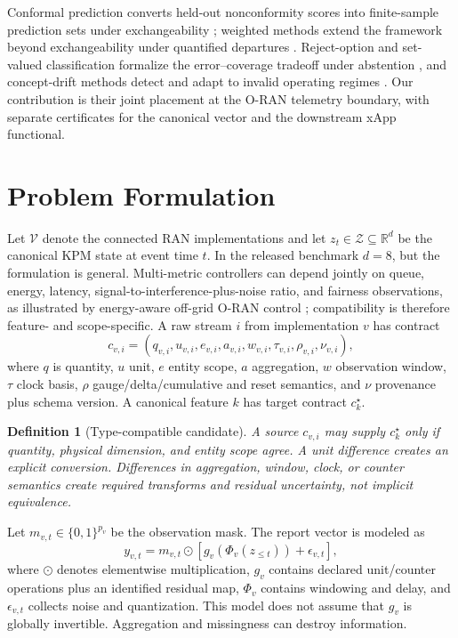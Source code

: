 \documentclass[10pt,journal,twoside]{IEEEtran}
\newtheorem{definition}{Definition}
\newcommand{\cV}{\mathcal{V}}
\newcommand{\cZ}{\mathcal{Z}}
\newcommand{\R}{\mathbb{R}}
\begin{document}
Conformal prediction converts held-out nonconformity scores into finite-sample prediction sets under exchangeability \cite{vovk2022algorithmic,angelopoulos2023conformal}; weighted methods extend the framework beyond exchangeability under quantified departures \cite{barber2023exchangeability}. Reject-option and set-valued classification formalize the error--coverage tradeoff under abstention \cite{chow1970reject,sadinle2018setvalued}, and concept-drift methods detect and adapt to invalid operating regimes \cite{gama2014drift,lu2019drift,webb2016drift,bifet2007adwin,page1954inspection}. Our contribution is their joint placement at the O-RAN telemetry boundary, with separate certificates for the canonical vector and the downstream xApp functional.

\section{Problem Formulation}
Let $\cV$ denote the connected RAN implementations and let $z_t\in\cZ\subseteq\R^d$ be the canonical KPM state at event time $t$. In the released benchmark $d=8$, but the formulation is general. Multi-metric controllers can depend jointly on queue, energy, latency, signal-to-interference-plus-noise ratio, and fairness observations, as illustrated by energy-aware off-grid O-RAN control \cite{alkarawi2025offgrid}; compatibility is therefore feature- and scope-specific. A raw stream $i$ from implementation $v$ has contract
\begin{equation}
c_{v,i}=(q_{v,i},u_{v,i},e_{v,i},a_{v,i},w_{v,i},\tau_{v,i},\rho_{v,i},\nu_{v,i}),
\label{eq:contract}
\end{equation}
where $q$ is quantity, $u$ unit, $e$ entity scope, $a$ aggregation, $w$ observation window, $\tau$ clock basis, $\rho$ gauge/delta/cumulative and reset semantics, and $\nu$ provenance plus schema version. A canonical feature $k$ has target contract $c_k^\star$.

\begin{definition}[Type-compatible candidate]
A source $c_{v,i}$ may supply $c_k^\star$ only if quantity, physical dimension, and entity scope agree. A unit difference creates an explicit conversion. Differences in aggregation, window, clock, or counter semantics create required transforms and residual uncertainty, not implicit equivalence.
\end{definition}

Let $m_{v,t}\in\{0,1\}^{p_v}$ be the observation mask. The report vector is modeled as
\begin{equation}
y_{v,t}=m_{v,t}\odot\left[g_v\!\left(\Phi_v(z_{\le t})\right)+\epsilon_{v,t}\right],
\label{eq:observation}
\end{equation}
where $\odot$ denotes elementwise multiplication, $g_v$ contains declared unit/counter operations plus an identified residual map, $\Phi_v$ contains windowing and delay, and $\epsilon_{v,t}$ collects noise and quantization. This model does not assume that $g_v$ is globally invertible. Aggregation and missingness can destroy information.
\end{document}
